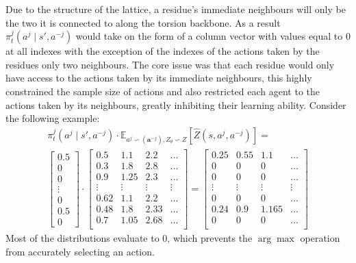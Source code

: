 Due to the structure of the lattice, a residue's
immediate neighbours will only be the two it is
connected to along the torsion backbone. 
As a result $\pi^j_t(a^j \mid s',a^{-j})$ would take
on the form of a column vector with values equal
to 0 at all indexes with the exception of the 
indexes of the actions taken by the residues
only two neighbours. The core issue was that
each residue would only have access to the actions 
taken by its immediate neighbours, this highly
constrained the sample size of actions and also
restricted each agent to the actions taken by its neighbours,
greatly inhibiting their learning ability. 
Consider the following
example:
\begin{equation}
    \begin{gathered}
        \pi^j_t(a^j \mid s',a^{-j}) \cdot \mathbb{E}_{a^j \backsim(\mathbf{a}^{-j}), Z_\theta \backsim Z}[\hat{Z}(s,a^j, a^{-j})] = \\
        \begin{bmatrix}
            0.5\\0\\0\\\vdots\\0\\0.5\\0
        \end{bmatrix} \cdot 
        \begin{bmatrix}
            0.5 & 1.1 & 2.2 & \hdots\\
            0.3 & 1.8 & 2.8 & \hdots\\
            0.9 & 1.25 & 2.3 & \hdots\\
            \vdots & \vdots & \vdots & \vdots\\
            0.62 & 1.1 & 2.2 & \hdots\\
            0.48 & 1.8 & 2.33 & \hdots\\
            0.7 & 1.05 & 2.68 & \hdots\\
        \end{bmatrix} = \begin{bmatrix}
            0.25 & 0.55 & 1.1 & \hdots\\
            0 & 0 & 0 & \hdots\\
            0 & 0 & 0 & \hdots\\
            \vdots & \vdots & \vdots & \vdots\\
            0 & 0 & 0 & \hdots\\
            0.24 & 0.9 & 1.165 & \hdots\\
            0 & 0 & 0 & \hdots\\
        \end{bmatrix}
    \end{gathered}
\end{equation}
Most of the distributions evaluate to 0,
which prevents the $\arg \max$ operation from accurately selecting an action.






